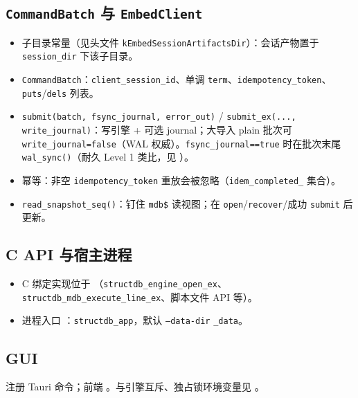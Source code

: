 \subsection{\texttt{CommandBatch} 与 \texttt{EmbedClient}}


\begin{itemize}
  \item 子目录常量（见头文件 \texttt{kEmbedSessionArtifactsDir}）：会话产物置于 \texttt{session\_dir} 下该子目录。
  \item \texttt{CommandBatch}：\texttt{client\_session\_id}、单调 \texttt{term}、\texttt{idempotency\_token}、\texttt{puts}/\texttt{dels} 列表。
  \item \texttt{submit(batch, fsync\_journal, error\_out)} / \texttt{submit\_ex(..., write\_journal)}：写引擎 + 可选 journal；大导入 plain 批次可 \texttt{write\_journal=false}（WAL 权威）。\texttt{fsync\_journal==true} 时在批次末尾 \texttt{wal\_sync()}（耐久 Level 1 类比，见 ）。
  \item 幂等：非空 \texttt{idempotency\_token} 重放会被忽略（\texttt{idem\_completed\_} 集合）。
  \item \texttt{read\_snapshot\_seq()}：钉住 \texttt{mdb\$} 读视图；在 \texttt{open}/\texttt{recover}/成功 \texttt{submit} 后更新。
\end{itemize}

\subsection{C API 与宿主进程}

\begin{itemize}
  \item C 绑定实现位于 （\texttt{structdb\_engine\_open\_ex}、\texttt{structdb\_mdb\_execute\_line\_ex}、脚本文件 API 等）。
  \item 进程入口 ：\texttt{structdb\_app}，默认 \texttt{--data-dir} \texttt{\_data}。
\end{itemize}

\subsection{GUI}

 注册 Tauri 命令；前端 。与引擎互斥、独占锁环境变量见 。

